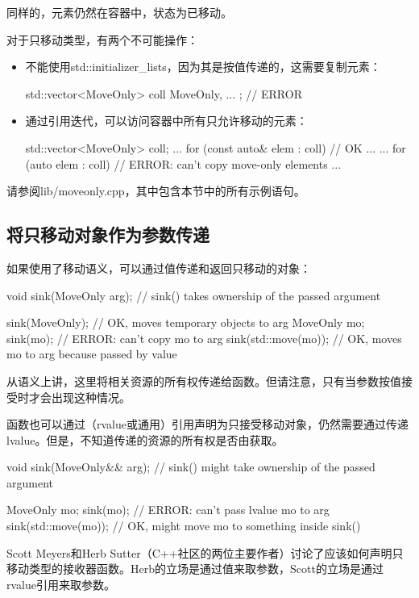 同样的，元素仍然在容器中，状态为已移动。

对于只移动类型，有两个不可能操作：

\begin{itemize}
\item 不能使用std::initializer_lists，因为其是按值传递的，这需要复制元素：
\begin{cppcode}
std::vector<MoveOnly> coll{ MoveOnly{}, ... }; // ERROR
\end{cppcode}
\item 通过引用迭代，可以访问容器中所有只允许移动的元素：
\begin{cppcode}
std::vector<MoveOnly> coll;
...
for (const auto& elem : coll) { // OK
	...
}
...
for (auto elem : coll) { // ERROR: can’t copy move-only elements
	...
}
\end{cppcode}
\end{itemize}

请参阅lib/moveonly.cpp，其中包含本节中的所有示例语句。

\subsection{将只移动对象作为参数传递}

如果使用了移动语义，可以通过值传递和返回只移动的对象：

\begin{cppcode}
void sink(MoveOnly arg); // sink() takes ownership of the passed argument

sink(MoveOnly{}); // OK, moves temporary objects to arg
MoveOnly mo;
sink(mo); // ERROR: can’t copy mo to arg
sink(std::move(mo)); // OK, moves mo to arg because passed by value
\end{cppcode}

从语义上讲，这里将相关资源的所有权传递给函数。但请注意，只有当参数按值接受时才会出现这种情况。

函数也可以通过（rvalue或通用）引用声明为只接受移动对象，仍然需要通过传递lvalue。但是，不知道传递的资源的所有权是否由获取。

\begin{cppcode}
void sink(MoveOnly&& arg); // sink() might take ownership of the passed argument

MoveOnly mo;
sink(mo); // ERROR: can’t pass lvalue mo to arg
sink(std::move(mo)); // OK, might move mo to something inside sink()
\end{cppcode}

Scott Meyers和Herb Sutter（C++社区的两位主要作者）讨论了应该如何声明只移动类型的接收器函数。Herb的立场是通过值来取参数，Scott的立场是通过rvalue引用来取参数。

